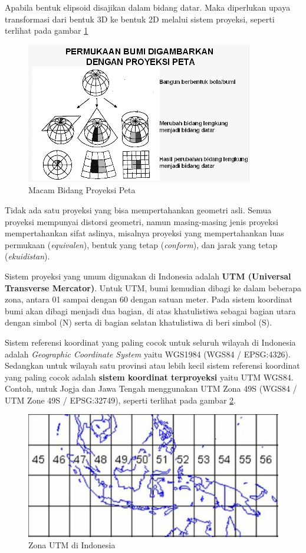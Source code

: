 \begin{itemize}
    Apabila bentuk elipsoid disajikan dalam bidang datar. Maka diperlukan upaya transformasi dari bentuk 3D ke bentuk 2D melalui sistem proyeksi, seperti terlihat pada gambar \ref{fig:macamproyeksipeta}
    
    \begin{figure}[H]
      \centering
      \includegraphics[scale=1]{./resources/016-macam-bidang-proyeksi-peta}
      \caption{Macam Bidang Proyeksi Peta}
      \label{fig:macamproyeksipeta}
    \end{figure}
    
    Tidak ada satu proyeksi yang bisa mempertahankan geometri asli. Semua proyeksi mempunyai distorsi geometri, namun masing-masing jenis proyeksi mempertahankan sifat aslinya, misalnya proyeksi yang mempertahankan luas permukaan (\textit{equivalen}), bentuk yang tetap (\textit{conform}), dan jarak yang tetap (\textit{ekuidistan}).
    
    Sistem proyeksi yang umum digunakan di Indonesia adalah \textbf{UTM (Universal Transverse Mercator)}. Untuk UTM, bumi kemudian dibagi ke dalam beberapa zona, antara 01 sampai dengan 60 dengan satuan meter. Pada sistem koordinat bumi akan dibagi menjadi dua bagian, di atas khatulistiwa sebagai bagian utara dengan simbol (N) serta di bagian selatan khatulistiwa di beri simbol (S).
    
    Sistem referensi koordinat yang paling cocok untuk seluruh wilayah di Indonesia adalah \textit{Geographic Coordinate System} yaitu WGS1984 (WGS84 / EPSG:4326). Sedangkan untuk wilayah satu provinsi atau lebih kecil sistem referensi koordinat yang paling cocok adalah \textbf{sistem koordinat terproyeksi} yaitu UTM WGS84. Contoh, untuk Jogja dan Jawa Tengah menggunakan UTM Zona 49S (WGS84 / UTM Zone 49S / EPSG:32749), seperti terlihat pada gambar \ref{fig:utmindonesia}.
    
    \begin{figure}[H]
      \centering
      \includegraphics[width=1\textwidth]{./resources/017-utm-indonesia}
      \caption{Zona UTM di Indonesia}
      \label{fig:utmindonesia}
    \end{figure}
\end{itemize}